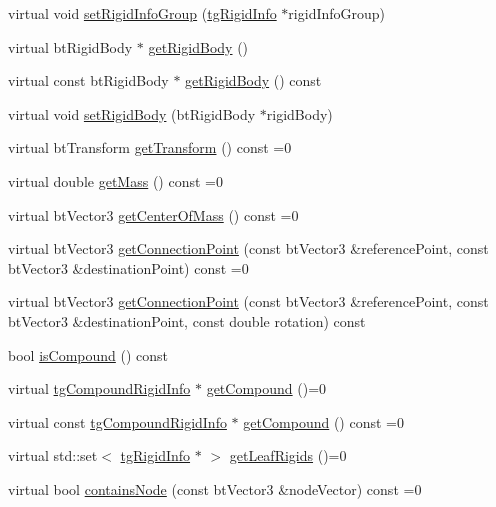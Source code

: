 \begin{DoxyCompactItemize}
\item 
virtual void \hyperlink{classtg_rigid_info_ad8a4b26de8d647ff945076dfc03e709f}{set\-Rigid\-Info\-Group} (\hyperlink{classtg_rigid_info}{tg\-Rigid\-Info} $\ast$rigid\-Info\-Group)
\item 
virtual bt\-Rigid\-Body $\ast$ \hyperlink{classtg_rigid_info_aa729160748dca4c89bc4dcb84e357c4f}{get\-Rigid\-Body} ()
\item 
virtual const bt\-Rigid\-Body $\ast$ \hyperlink{classtg_rigid_info_af5f63cc39e1d34cd9190f9c1e2bb752b}{get\-Rigid\-Body} () const 
\item 
virtual void \hyperlink{classtg_rigid_info_a6a27b3d380b20c36a1c41392b7f6e2be}{set\-Rigid\-Body} (bt\-Rigid\-Body $\ast$rigid\-Body)
\item 
virtual bt\-Transform \hyperlink{classtg_rigid_info_a18546401332c62360d28225594129f60}{get\-Transform} () const =0
\item 
virtual double \hyperlink{classtg_rigid_info_ae0e3f72c6dc4fd1e852ca9d27935bbe2}{get\-Mass} () const =0
\item 
virtual bt\-Vector3 \hyperlink{classtg_rigid_info_afadf95cbc744d14eb8bdb00a5498fbbb}{get\-Center\-Of\-Mass} () const =0
\item 
virtual bt\-Vector3 \hyperlink{classtg_rigid_info_a347721597db231b7eefc5b01a59346cc}{get\-Connection\-Point} (const bt\-Vector3 \&reference\-Point, const bt\-Vector3 \&destination\-Point) const =0
\item 
virtual bt\-Vector3 \hyperlink{classtg_rigid_info_ad52c51a8d052daf9b8a8c00d80f4b9f8}{get\-Connection\-Point} (const bt\-Vector3 \&reference\-Point, const bt\-Vector3 \&destination\-Point, const double rotation) const 
\item 
bool \hyperlink{classtg_rigid_info_aa20950230ff2c3346af0629e1ecd0f51}{is\-Compound} () const 
\item 
virtual \hyperlink{classtg_compound_rigid_info}{tg\-Compound\-Rigid\-Info} $\ast$ \hyperlink{classtg_rigid_info_af52e7743e7fb7ed3530cd101e464c242}{get\-Compound} ()=0
\item 
virtual const \hyperlink{classtg_compound_rigid_info}{tg\-Compound\-Rigid\-Info} $\ast$ \hyperlink{classtg_rigid_info_a87335e33b2c650447dcf644bd85e6ace}{get\-Compound} () const =0
\item 
virtual std\-::set$<$ \hyperlink{classtg_rigid_info}{tg\-Rigid\-Info} $\ast$ $>$ \hyperlink{classtg_rigid_info_ad1d699be1d892fac10575f7dd1d1d6de}{get\-Leaf\-Rigids} ()=0
\item 
virtual bool \hyperlink{classtg_rigid_info_abbc82d1601b04c86a77c1719b56f92b4}{contains\-Node} (const bt\-Vector3 \&node\-Vector) const =0

\end{DoxyCompactItemize}
